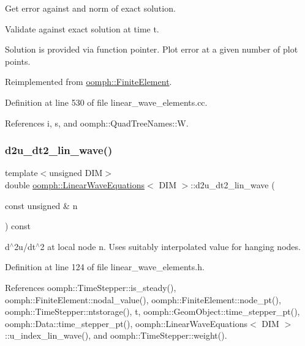 Get error against and norm of exact solution. 

Validate against exact solution at time t.

Solution is provided via function pointer. Plot error at a given number of plot points. 

Reimplemented from \hyperlink{classoomph_1_1FiniteElement_a7f67853506dc73fa6b7505108de22d1f}{oomph\+::\+Finite\+Element}.



Definition at line 530 of file linear\+\_\+wave\+\_\+elements.\+cc.



References i, s, and oomph\+::\+Quad\+Tree\+Names\+::W.

\mbox{\label{classoomph_1_1LinearWaveEquations_ac249d0568e64e09da880f7b1b0f80cdd}} 
\subsubsection{\texorpdfstring{d2u\+\_\+dt2\+\_\+lin\+\_\+wave()}{d2u\_dt2\_lin\_wave()}}
{\footnotesize\ttfamily template$<$unsigned D\+IM$>$ \\
double \hyperlink{classoomph_1_1LinearWaveEquations}{oomph\+::\+Linear\+Wave\+Equations}$<$ D\+IM $>$\+::d2u\+\_\+dt2\+\_\+lin\+\_\+wave (\begin{DoxyParamCaption}\item[{const unsigned \&}]{n }\end{DoxyParamCaption}) const\hspace{0.3cm}{\ttfamily [inline]}}



d$^\wedge$2u/dt$^\wedge$2 at local node n. Uses suitably interpolated value for hanging nodes. 



Definition at line 124 of file linear\+\_\+wave\+\_\+elements.\+h.



References oomph\+::\+Time\+Stepper\+::is\+\_\+steady(), oomph\+::\+Finite\+Element\+::nodal\+\_\+value(), oomph\+::\+Finite\+Element\+::node\+\_\+pt(), oomph\+::\+Time\+Stepper\+::ntstorage(), t, oomph\+::\+Geom\+Object\+::time\+\_\+stepper\+\_\+pt(), oomph\+::\+Data\+::time\+\_\+stepper\+\_\+pt(), oomph\+::\+Linear\+Wave\+Equations$<$ D\+I\+M $>$\+::u\+\_\+index\+\_\+lin\+\_\+wave(), and oomph\+::\+Time\+Stepper\+::weight().



